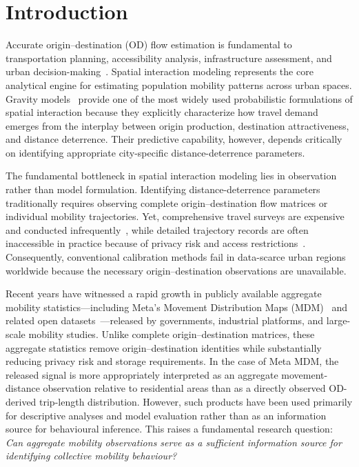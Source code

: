 \documentclass[pdflatex,sn-basic,iicol]{sn-jnl}
\begin{document}
\section{Introduction}

Accurate origin--destination (OD) flow estimation is fundamental to transportation planning, accessibility analysis, infrastructure assessment, and urban decision-making~\citep{barbosa2018human,gonzalez2008understanding,song2010limits}. Spatial interaction modeling represents the core analytical engine for estimating population mobility patterns across urban spaces. Gravity models~\citep{wilson1971,tanner1961} provide one of the most widely used probabilistic formulations of spatial interaction because they explicitly characterize how travel demand emerges from the interplay between origin production, destination attractiveness, and distance deterrence. Their predictive capability, however, depends critically on identifying appropriate city-specific distance-deterrence parameters.

The fundamental bottleneck in spatial interaction modeling lies in observation rather than model formulation. Identifying distance-deterrence parameters traditionally requires observing complete origin--destination flow matrices or individual mobility trajectories. Yet, comprehensive travel surveys are expensive and conducted infrequently~\citep{egu2020comparable,hussain2021transit}, while detailed trajectory records are often inaccessible in practice because of privacy risk and access restrictions~\citep{de2013unique}. Consequently, conventional calibration methods fail in data-scarce urban regions worldwide because the necessary origin--destination observations are unavailable.

Recent years have witnessed a rapid growth in publicly available aggregate mobility statistics—including Meta's Movement Distribution Maps (MDM)~\citep{MetaMovementDistributionMaps} and related open datasets~\citep{oliver2020mobile,buckee2020aggregated,pappalardo2023analytical}—released by governments, industrial platforms, and large-scale mobility studies. Unlike complete origin--destination matrices, these aggregate statistics remove origin--destination identities while substantially reducing privacy risk and storage requirements. In the case of Meta MDM, the released signal is more appropriately interpreted as an aggregate movement-distance observation relative to residential areas than as a directly observed OD-derived trip-length distribution. However, such products have been used primarily for descriptive analyses and model evaluation rather than as an information source for behavioural inference. This raises a fundamental research question: \emph{Can aggregate mobility observations serve as a sufficient information source for identifying collective mobility behaviour?}
\end{document}
